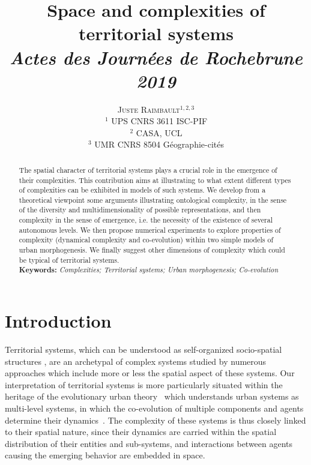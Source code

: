 \documentclass[11pt]{article}
\newcommand{\noun}[1]{\textsc{#1}}
\begin{document}
\title{Space and complexities of territorial systems
\\\bigskip
\textit{Actes des Journ{\'e}es de Rochebrune 2019}
}
\author{\noun{Juste Raimbault}$^{1,2,3}$
\bigskip\\
$^1$ UPS CNRS 3611 ISC-PIF\\
$^2$ CASA, UCL\\
$^3$ UMR CNRS 8504 G{\'e}ographie-cit{\'e}s
}
\date{}





\maketitle

\justify

\begin{abstract}
	The spatial character of territorial systems plays a crucial role in the emergence of their complexities. This contribution aims at illustrating to what extent different types of complexities can be exhibited in models of such systems. We develop from a theoretical viewpoint some arguments illustrating ontological complexity, in the sense of the diversity and multidimensionality of possible representations, and then complexity in the sense of emergence, i.e. the necessity of the existence of several autonomous levels. We then propose numerical experiments to explore properties of complexity (dynamical complexity and co-evolution) within two simple models of urban morphogenesis. We finally suggest other dimensions of complexity which could be typical of territorial systems.\medskip\\
	\noindent\textbf{Keywords: }\textit{Complexities; Territorial systems; Urban morphogenesis; Co-evolution}
\end{abstract}





\section{Introduction}


Territorial systems, which can be understood as self-organized socio-spatial structures  \citep{pumain1997pour}, are an archetypal of complex systems studied by numerous approaches which include more or less the spatial aspect of these systems. Our interpretation of territorial systems is more particularly situated within the heritage of the evolutionary urban theory~\citep{pumain2018evolutionary} which understands urban systems as multi-level systems, in which the co-evolution of multiple components and agents determine their dynamics~\citep{raimbault2018caracterisation}. The complexity of these systems is thus closely linked to their spatial nature, since their dynamics are carried within the spatial distribution of their entities and sub-systems, and interactions between agents causing the emerging behavior are embedded in space.
\end{document}
